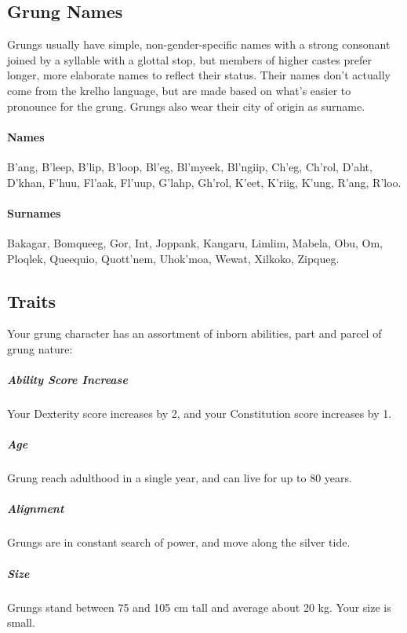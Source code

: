 \subsection*{Grung Names}
    Grungs usually have simple, non-gender-specific names with a strong consonant joined by a syllable with a glottal stop, but members of higher castes prefer longer, more elaborate names to reflect their status.
    Their names don't actually come from the krelho language, but are made based on what's easier to pronounce for the grung.
    Grungs also wear their city of origin as surname.

    \paragraph{Names}
    B'ang, B'leep, B'lip, B'loop, Bl'eg, Bl'myeek, Bl'ngiip, Ch'eg, Ch'rol, D'aht, D'khan, F'huu, Fl'aak, Fl'uup, G'lahp, Gh'rol, K'eet, K'riig, K'ung, R'ang, R'loo.

    \paragraph{Surnames}
    Bakagar, Bomqueeg, Gor, Int, Joppank, Kangaru, Limlim, Mabela, Obu, Om, Ploqlek, Queequio, Quott'nem, Uhok'moa, Wewat, Xilkoko, Zipqueg.


\subsection*{Traits}
    Your grung character has an assortment of inborn abilities, part and parcel of grung nature:

    \subparagraph{Ability Score Increase} Your Dexterity score increases by 2, and your Constitution score increases by 1.

    \subparagraph{Age} Grung reach adulthood in a single year, and can live for up to 80 years.

    \subparagraph{Alignment} %
    Grungs are in constant search of power, and move along the silver tide.

    \subparagraph{Size} Grungs stand between 75 and 105 cm tall and average about 20 kg.
    Your size is small.

